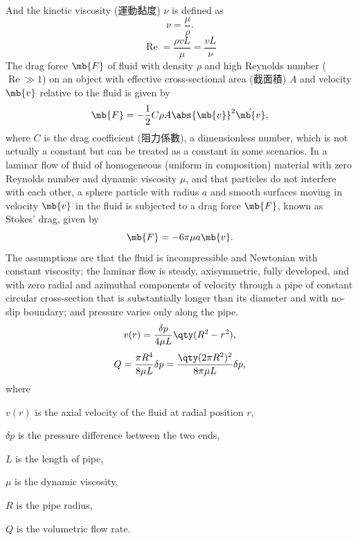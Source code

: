 \documentclass[a4paper,12pt]{article}
\begin{document}
And the kinetic viscosity (運動黏度) $\nu$ is defined as
\[\nu=\frac{\mu}{\rho}.\]
\[\operatorname{Re}=\frac{\rho v L}{\mu}=\frac{v L}{\nu}\]
The drag force $\mb{F}$ of fluid with density $\rho$ and high Reynolds number ($\operatorname{Re}\gg 1$) on an object with effective cross-sectional area (截面積) $A$ and velocity $\mb{v}$ relative to the fluid is given by
\[\mb{F}=-\frac{1}{2}C\rho A\abs{\mb{v}}^2\hat{\mb{v}},\]
where $C$ is the drag coefficient (阻力係數), a dimensionless number, which is not actually a constant but can be treated as a constant in some scenarios.
In a laminar flow of fluid of homogeneous (uniform in composition) material with zero Reynolds number and dynamic viscosity $\mu$, and that particles do not interfere with each other, a sphere particle with radius $a$ and smooth surfaces moving in velocity $\mb{v}$ in the fluid is subjected to a drag force $\mb{F}$, known as Stokes' drag, given by
\[\mb{F}=-6\pi\mu a\mb{v}.\]
The assumptions are that the fluid is incompressible and Newtonian with constant viscosity; the laminar flow is steady, axisymmetric, fully developed, and with zero radial and azimuthal components of velocity through a pipe of constant circular cross-section that is substantially longer than its diameter and with no-slip boundary; and pressure varies only along the pipe.
\[v(r)=\frac{\delta p}{4\mu L}\qty(R^2-r^2),\]
\[Q=\frac{\pi R^4}{8\mu L}\delta p=\frac{\qty(2\pi R^2)^2}{8\pi\mu L}\delta p,\]
where
\bit
\item $v(r)$ is the axial velocity of the fluid at radial position $r$,
\item $\delta p$ is the pressure difference between the two ends,
\item $L$ is the length of pipe,
\item $\mu$ is the dynamic viscosity,
\item $R$ is the pipe radius,
\item $Q$ is the volumetric flow rate.
\eit
\end{document}
